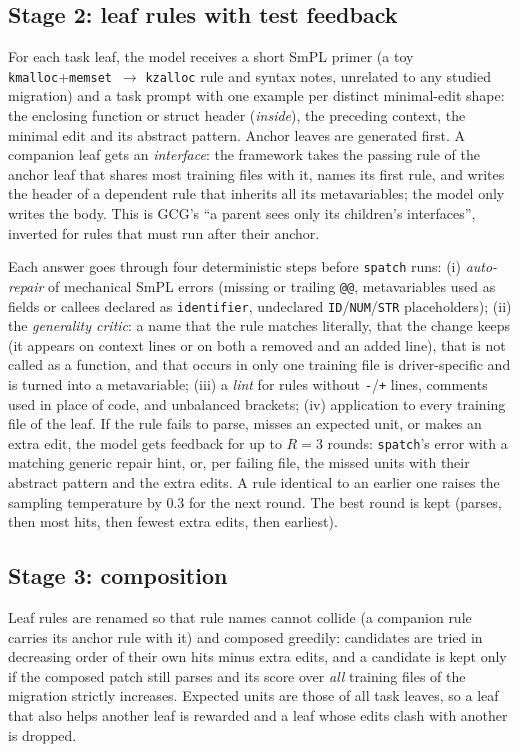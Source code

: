 \subsection{Stage 2: leaf rules with test feedback}
For each task leaf, the model receives a short SmPL primer (a toy \texttt{kmalloc}+\texttt{memset}~$\to$
\texttt{kzalloc} rule and syntax notes, unrelated to any studied migration) and a task prompt with one example per
distinct minimal-edit shape: the enclosing function or struct header (\emph{inside}), the preceding context, the
minimal edit and its abstract pattern. Anchor leaves are generated first. A companion leaf gets an
\emph{interface}: the framework takes the passing rule of the anchor leaf that shares most training files with it,
names its first rule, and writes the header of a dependent rule that inherits all its metavariables; the model only
writes the body. This is GCG's ``a parent sees only its children's interfaces'', inverted for rules that must run
after their anchor.

Each answer goes through four deterministic steps before \texttt{spatch} runs:
(i) \emph{auto-repair} of mechanical SmPL errors (missing or trailing \texttt{@@}, metavariables used as fields or
callees declared as \texttt{identifier}, undeclared \texttt{ID}/\texttt{NUM}/\texttt{STR} placeholders);
(ii) the \emph{generality critic}: a name that the rule matches literally, that the change keeps (it appears on
context lines or on both a removed and an added line), that is not called as a function, and that occurs in only
one training file is driver-specific and is turned into a metavariable;
(iii) a \emph{lint} for rules without \texttt{-}/\texttt{+} lines, comments used in place of code, and unbalanced
brackets; (iv) application to every training file of the leaf. If the rule fails to parse, misses an expected
unit, or makes an extra edit, the model gets feedback for up to $R=3$ rounds: \texttt{spatch}'s error with a
matching generic repair hint, or, per failing file, the missed units with their abstract pattern and the extra edits.
A rule identical to an earlier one raises the sampling temperature by 0.3 for the next round. The best round is
kept (parses, then most hits, then fewest extra edits, then earliest).

\subsection{Stage 3: composition}
Leaf rules are renamed so that rule names cannot collide (a companion rule carries its anchor rule with it) and
composed greedily: candidates are tried in decreasing order of their own hits minus extra edits, and a candidate is
kept only if the composed patch still parses and its score over \emph{all} training files of the migration
strictly increases. Expected units are those of all task leaves, so a leaf that also helps another leaf is
rewarded and a leaf whose edits clash with another is dropped.

